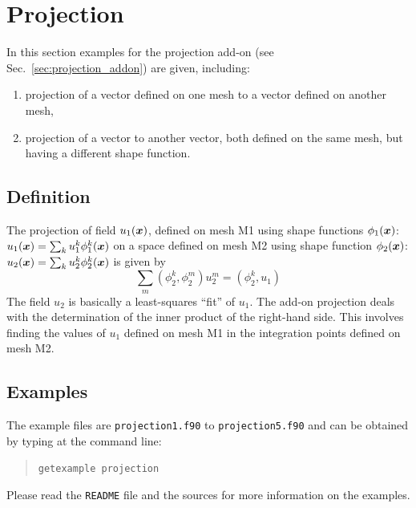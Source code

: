 
\def\headdate{21st June 2012}

\section{Projection}
\label{sec:projection}

In this section examples for the projection add-on (see
Sec.~\ref{sec:projection_addon}) are given, including:
\begin{enumerate}
   \item projection of a vector defined on one mesh to a vector defined on
         another mesh,
   \item projection of a vector to another vector, both defined on the same
         mesh, but having a different shape function.
\end{enumerate}

\subsection{Definition}

The projection of field $u_1(\boldsymbol{x})$, defined on mesh M1 using shape functions
$\phi_1(\boldsymbol{x})$: $u_1(\boldsymbol{x})=\sum_k u_1^k\phi_1^k(\boldsymbol{x})$ on a space 
defined on mesh M2 using shape function
$\phi_2(\boldsymbol{x})$: $u_2(\boldsymbol{x})=\sum_k u_2^k\phi_2^k(\boldsymbol{x})$ is given by
\begin{equation}
  \sum_m (\phi^k_2,\phi^m_2) u_2^m = (\phi^k_2,u_1)
\end{equation}
The field $u_2$ is basically a least-squares ``fit'' of $u_1$. The add-on
projection deals with the determination of the inner product of the
right-hand side. This involves finding the values of $u_1$ defined on mesh M1
in the integration points defined on mesh M2.

\subsection{Examples}

The example files are \texttt{projection1.f90} to 
\texttt{projection5.f90} 
and can be obtained by typing at the
command line:
\medskip
\begin{quote}
   \texttt{getexample projection}
\end{quote}
Please read the \texttt{README} file and the sources for more information
on the examples.
